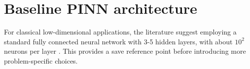 %
%
%
%
%
%


%
%
%
%
%
%
%



\section{Baseline PINN architecture}

For classical low-dimensional applications,
the literature suggest employing a standard fully connected neural network with 3-5 hidden layers,
with about $10^2$ neurons per layer \cite{pinns_original,loss_landscape,experts_guide,comprehensive_review_th}.
This provides a save reference point before introducing more problem-specific choices.



